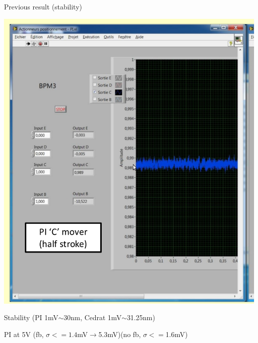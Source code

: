 \documentclass[a4paper,11pt]{book}
\begin{document}
 Previous result (stability)\par
 \includegraphics[scale=0.25,angle=0]{image_PI_avant_partir.jpg}\par
Stability (PI 1mV$\sim$30nm, Cedrat 1mV$\sim$31.25nm)\par
PI at 5V \hspace{0.5cm}(fb, $\sigma<=1.4$mV$\rightarrow${\color{red}5.3mV})\hspace{0.4cm}(no fb, $\sigma<=$1.6mV)\par
\end{document}
